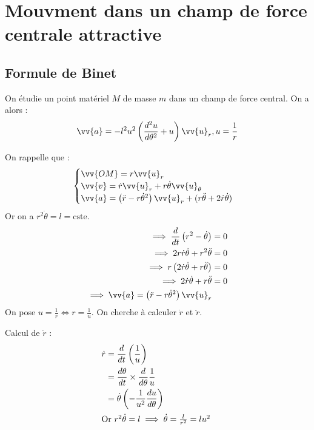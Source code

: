 \section{Mouvment dans un champ de force centrale attractive}
\subsection{Formule de Binet}

\begin{theorem}
    On étudie un point matériel \(M\) de masse \(m\) dans un champ de force central. On a alors :
    \[
        \vv{a} = -l^{2}u^{2}\left( \frac{d^{2}u}{d \theta^{2}} + u \right) \vv{u}_{r}, u = \frac{1}{r}
    \]
\end{theorem}
\newpage
\begin{explanation}
    On rappelle que : 
    \[
        \begin{cases}
            \vv{OM} = r\vv{u}_{r} \\
            \vv{v} = \dot{r}\vv{u}_{r} + r\dot{\theta}\vv{u}_{\theta} \\
            \vv{a} = \left(\ddot{r}-r\dot{\theta}^{2}\right)\vv{u}_{r} + (r \ddot{\theta} + 2\dot{r}\dot{\theta})
        \end{cases}
    \]  
    Or on a \(r^{2}\dot{\theta} = l = \text{cste}\). 
    \begin{align*}
        \implies \frac{d}{dt}\left( r^{2} - \dot{\theta} \right) &= 0 \\
        \implies 2r\dot{r}\dot{\theta} +r^{2}\ddot{\theta} &= 0 \\
        \implies r\left( 2\dot{r}\dot{\theta} + r \ddot{\theta} \right) &= 0 \\
        \implies 2\dot{r}\dot{\theta} + r \ddot{\theta} &= 0 \\
        \implies \vv{a} = \left( \ddot{r} - r \dot{\theta}^{2} \right)\vv{u}_{r}
    \end{align*}
    On pose \(u = \frac{1}{r} \iff r = \frac{1}{u}\). On cherche à calculer \(\dot{r}\) et \(\ddot{r}\). \par
    Calcul de \(\dot{r}\) : 
    \begin{align*}
        \dot{r} &= \frac{d}{dt} \left( \frac{1}{u} \right) \\
        &= \frac{d \theta}{dt} \times \frac{d}{d \theta} \frac{1}{u}\\
        &= \dot{\theta}\left( -\frac{1}{u^{2}} \frac{du}{d \theta} \right) \\
        \intertext{Or \(r^{2}\dot{\theta} = l \implies \dot{\theta} = \frac{l}{r^{2}}  = lu^{2}\) }

\end{align*}
\end{explanation}
